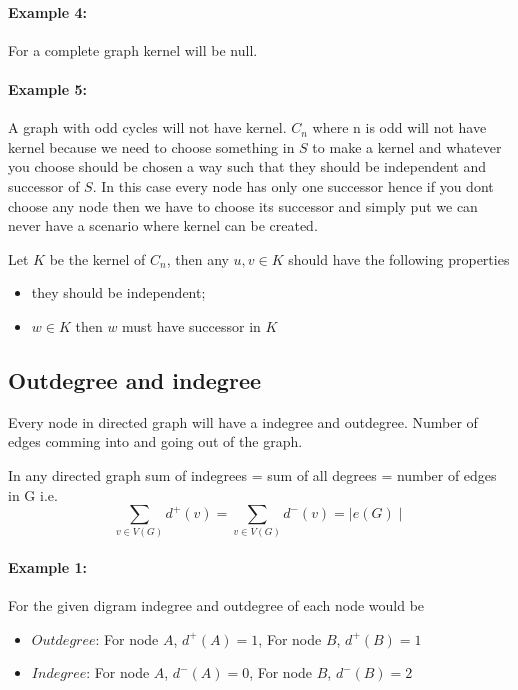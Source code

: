 \paragraph{Example 4:}For a complete graph kernel will be null. 

\paragraph{Example 5:}A graph with odd cycles will not have kernel. $ C_n$ where n is odd will not have kernel because we need to choose something in $ S $ to make a kernel and whatever you choose should be chosen a way such that they should be independent and successor of $ S $. In this case every node has only one successor hence if you dont choose any node then we have to choose its successor and simply put we can never have a scenario where kernel can be created.

Let $ K $ be the kernel of $C_n$, then any $u,v \in K$ should have the following properties 

\begin{itemize}
    \item they should be independent;
    \item $ w \in K$ then $w$ must have successor in $K$
    \end{itemize}

\subsection{Outdegree and indegree}

Every node in directed graph will have a indegree and outdegree. Number of edges comming into and going out of the graph. 

In any directed graph sum of indegrees = sum of all degrees = number of edges in G i.e. \begin{equation}
    {\textstyle \sum_{v \in V(G)}} d^+(v) = {\textstyle \sum_{v \in V(G)}}  d^-(v) = {\textstyle \mid e(G) \mid}
 \end{equation}

\paragraph{Example 1:}For the given digram indegree and outdegree of each node would be\begin{itemize}
    \item $Outdegree$: For node $A$, $d^+(A) = 1$, For node $B$, $d^+(B) = 1$ 
    \item $Indegree$: For node $A$, $d^-(A) = 0$, For node $B$, $d^-(B) = 2$ 
    \end{itemize}

